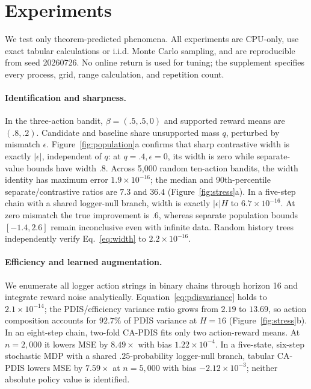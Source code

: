 \section{Experiments}

We test only theorem-predicted phenomena. All experiments are CPU-only, use exact tabular calculations or i.i.d. Monte Carlo sampling, and are reproducible from seed 20260726. No online return is used for tuning; the supplement specifies every process, grid, range calculation, and repetition count.

\paragraph{Identification and sharpness.}
In the three-action bandit, $\beta=(.5,.5,0)$ and supported reward means are $(.8,.2)$. Candidate and baseline share unsupported mass $q$, perturbed by mismatch $\epsilon$. Figure~\ref{fig:population}a confirms that sharp contrastive width is exactly $|\epsilon|$, independent of $q$: at $q=.4,\epsilon=0$, its width is zero while separate-value bounds have width $.8$. Across 5,000 random ten-action bandits, the width identity has maximum error $1.9\times10^{-16}$; the median and 90th-percentile separate/contrastive ratios are $7.3$ and $36.4$ (Figure~\ref{fig:stress}a). In a five-step chain with a shared logger-null branch, width is exactly $|\epsilon|H$ to $6.7\times10^{-16}$. At zero mismatch the true improvement is $.6$, whereas separate population bounds $[-1.4,2.6]$ remain inconclusive even with infinite data. Random history trees independently verify Eq.~\eqref{eq:width} to $2.2\times10^{-16}$.

\paragraph{Efficiency and learned augmentation.}
We enumerate all logger action strings in binary chains through horizon 16 and integrate reward noise analytically. Equation~\eqref{eq:pdisvariance} holds to $2.1\times10^{-14}$; the PDIS/efficiency variance ratio grows from $2.19$ to $13.69$, so action composition accounts for $92.7\%$ of PDIS variance at $H=16$ (Figure~\ref{fig:stress}b). In an eight-step chain, two-fold CA-PDIS fits only two action-reward means. At $n=2{,}000$ it lowers MSE by $8.49\times$ with bias $1.22\times10^{-4}$. In a five-state, six-step stochastic MDP with a shared $.25$-probability logger-null branch, tabular CA-PDIS lowers MSE by $7.59\times$ at $n=5{,}000$ with bias $-2.12\times10^{-3}$; neither absolute policy value is identified.

